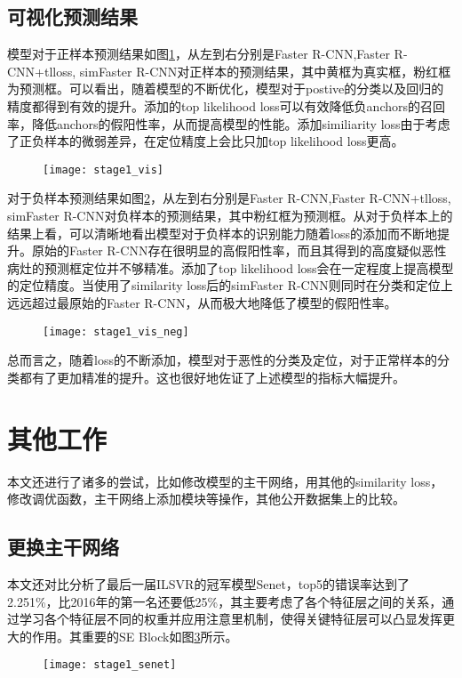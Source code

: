 \subsection{可视化预测结果}
模型对于正样本预测结果如图\ref{fig:stage1_vis}，从左到右分别是Faster R-CNN,Faster R-CNN+tlloss, simFaster R-CNN对正样本的预测结果，其中黄框为真实框，粉红框为预测框。可以看出，随着模型的不断优化，模型对于postive的分类以及回归的精度都得到有效的提升。添加的top likelihood loss可以有效降低负anchors的召回率，降低anchors的假阳性率，从而提高模型的性能。添加similiarity loss由于考虑了正负样本的微弱差异，在定位精度上会比只加top likelihood loss更高。
		\begin{figure}[!htbp]
    \centering
    \texttt{[image: stage1\_vis]}
    \label{fig:stage1_vis}
	\end{figure}
		
对于负样本预测结果如图\ref{fig:stage1_vis_neg}，从左到右分别是Faster R-CNN,Faster R-CNN+tlloss, simFaster R-CNN对负样本的预测结果，其中粉红框为预测框。从对于负样本上的结果上看，可以清晰地看出模型对于负样本的识别能力随着loss的添加而不断地提升。原始的Faster R-CNN存在很明显的高假阳性率，而且其得到的高度疑似恶性病灶的预测框定位并不够精准。添加了top likelihood loss会在一定程度上提高模型的定位精度。当使用了similarity loss后的simFaster R-CNN则同时在分类和定位上远远超过最原始的Faster R-CNN，从而极大地降低了模型的假阳性率。
	
	\begin{figure}[!htbp]
    \centering
    \texttt{[image: stage1\_vis\_neg]}
    \label{fig:stage1_vis_neg}
	\end{figure}
	
	总而言之，随着loss的不断添加，模型对于恶性的分类及定位，对于正常样本的分类都有了更加精准的提升。这也很好地佐证了上述模型的指标大幅提升。
\section{其他工作}
本文还进行了诸多的尝试，比如修改模型的主干网络，用其他的similarity loss，修改调优函数，主干网络上添加模块等操作，其他公开数据集上的比较。
\subsection{更换主干网络}
本文还对比分析了最后一届ILSVR的冠军模型Senet\cite{64hu2018squeeze}，top5的错误率达到了2.251\%，比2016年的第一名还要低25\%，其主要考虑了各个特征层之间的关系，通过学习各个特征层不同的权重并应用注意里机制，使得关键特征层可以凸显发挥更大的作用。其重要的SE Block如图\ref{fig:stage1_senet}所示。
			\begin{figure}[!htbp]
    \centering
    \texttt{[image: stage1\_senet]}
    \label{fig:stage1_senet}
	\end{figure}
	
